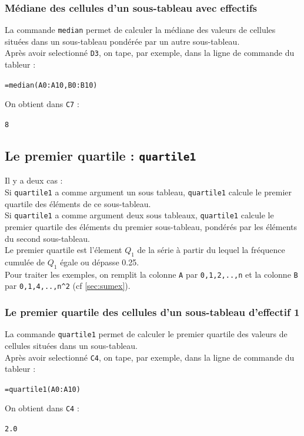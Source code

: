 \documentclass[a4paper,11pt]{book}
\begin{document}
\subsubsection{M\'ediane des cellules d'un sous-tableau avec effectifs}
La commande {\tt median} permet de calculer la m\'ediane des valeurs de
 cellules
 situ\'ees dans un sous-tableau pond\'er\'ee par un autre sous-tableau.\\ 
Apr\`es avoir selectionn\'e {\tt D3}, on tape, par exemple, dans la ligne de 
commande du tableur :
\begin{center}{\tt =median(A0:A10,B0:B10)}\end{center}
On obtient dans {\tt C7} :
\begin{center}{\tt 8}\end{center}
\subsection{Le premier quartile : {\tt quartile1}}
Il y a deux cas :\\
Si {\tt quartile1} a comme argument un sous tableau, {\tt quartile1} calcule le
premier quartile des \'el\'ements de ce sous-tableau.\\
Si {\tt quartile1} a comme argument deux sous tableaux, {\tt quartile1} calcule
 le premier quartile des \'el\'ements du premier sous-tableau, pond\'er\'es par
 les \'el\'ements du second sous-tableau.\\
 Le premier quartile est l'\'element 
$Q_1$ de la s\'erie \`a partir du lequel la fr\'equence cumul\'ee de $Q_1$ 
\'egale ou d\'epasse 0.25.\\
Pour traiter les exemples,  on remplit la colonne {\tt A} par 
{\tt 0,1,2,..,n} et la colonne 
{\tt B} par {\tt 0,1,4,..,n\verb|^|2} (cf \ref{sec:sumex}).
\subsubsection{Le premier quartile  des cellules d'un sous-tableau d'effectif 1}
La commande {\tt quartile1} permet de calculer le premier quartile
 des valeurs de
cellules situ\'ees dans un sous-tableau.\\ 
Apr\`es avoir selectionn\'e {\tt C4}, on tape, par exemple, dans la ligne de 
commande du tableur :
\begin{center}{\tt =quartile1(A0:A10)}\end{center}
On obtient dans {\tt C4} :
\begin{center}{\tt 2.0}\end{center}
\end{document}
